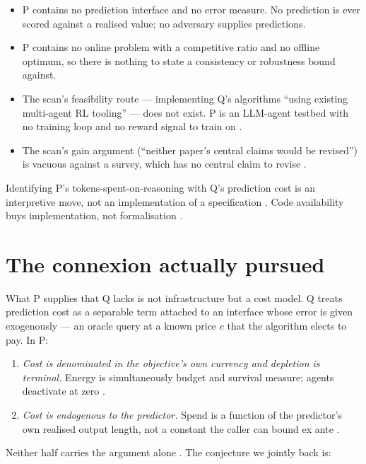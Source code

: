 \documentclass{article}
\begin{document}
\begin{itemize}
  \item P contains no prediction interface and no error measure. No prediction is ever
        scored against a realised value; no adversary supplies predictions.
  \item P contains no online problem with a competitive ratio and no offline optimum, so
        there is nothing to state a consistency or robustness bound against.
  \item The scan's feasibility route --- implementing Q's algorithms ``using existing
        multi-agent RL tooling'' --- does not exist. P is an LLM-agent testbed with no
        training loop and no reward signal to train on .
  \item The scan's gain argument (``neither paper's central claims would be revised'') is
        vacuous against a survey, which has no central claim to revise .
\end{itemize}

Identifying P's tokens-spent-on-reasoning with Q's prediction cost is an interpretive
move, not an implementation of a specification . Code availability buys
implementation, not formalisation .

\section{The connexion actually pursued}

What P supplies that Q lacks is not infrastructure but a cost model. Q treats prediction
cost as a separable term attached to an interface whose error is given exogenously --- an
oracle query at a known price \(c\) that the algorithm elects to pay. In P:

\begin{enumerate}
  \item \emph{Cost is denominated in the objective's own currency and depletion is
        terminal.} Energy is simultaneously budget and survival measure; agents deactivate
        at zero .
  \item \emph{Cost is endogenous to the predictor.} Spend is a function of the predictor's
        own realised output length, not a constant the caller can bound ex ante
        .
\end{enumerate}

Neither half carries the argument alone . The conjecture we jointly back
 is:
\end{document}
